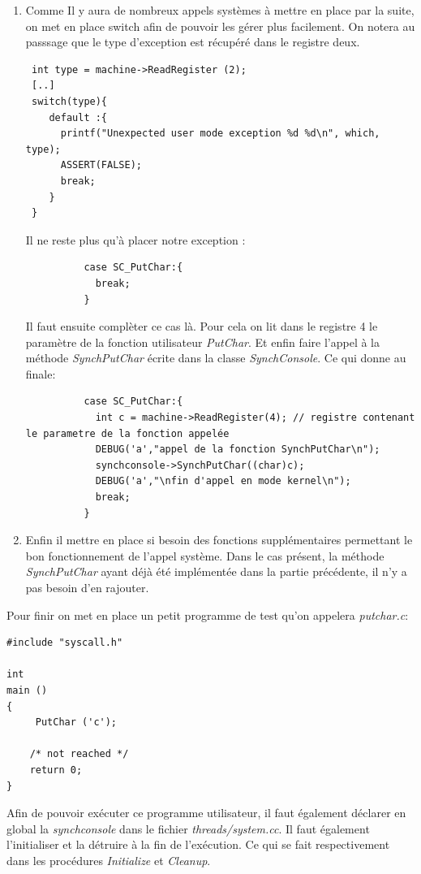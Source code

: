 \documentclass[a4paper,10pt]{article}
\begin{document}
\begin{enumerate}
  \item  Comme Il y aura de nombreux appels systèmes à mettre en place par la suite, on met en place switch afin de pouvoir les gérer plus facilement. 
  On notera au passsage que le type d'exception est récupéré dans le registre deux. 
\begin{lstlisting}
 int type = machine->ReadRegister (2);
 [..]
 switch(type){
    default :{
      printf("Unexpected user mode exception %d %d\n", which, type);
      ASSERT(FALSE);
      break;
    }
 }
\end{lstlisting}
  Il ne reste plus qu'à placer notre exception :
  \begin{lstlisting}
          case SC_PutChar:{
            break;
          }   
  \end{lstlisting}
 Il faut ensuite complèter ce cas là. Pour cela on lit dans le registre 4 le paramètre de la fonction utilisateur \emph{PutChar}. Et enfin faire l'appel
 à la méthode \emph{SynchPutChar} écrite dans la classe \emph{SynchConsole}. Ce qui donne au finale:
 \newpage
 \begin{lstlisting}
          case SC_PutChar:{
            int c = machine->ReadRegister(4); // registre contenant le parametre de la fonction appelée
            DEBUG('a',"appel de la fonction SynchPutChar\n");
            synchconsole->SynchPutChar((char)c);
            DEBUG('a',"\nfin d'appel en mode kernel\n");
            break;
          }  
 \end{lstlisting}
  \item Enfin il mettre en place si besoin des fonctions supplémentaires permettant le bon fonctionnement de l'appel système. Dans le cas présent, la méthode
  \emph{SynchPutChar} ayant déjà été implémentée dans la partie précédente, il n'y a pas besoin d'en rajouter.
  \end{enumerate}

  Pour finir on met en place un petit programme de test qu'on appelera \emph{putchar.c}:
  \begin{lstlisting}
#include "syscall.h"

int
main ()
{
     PutChar ('c');

    /* not reached */
    return 0;
}   
  \end{lstlisting}
  Afin de pouvoir exécuter ce programme utilisateur, il faut également déclarer en global la \emph{synchconsole} dans le fichier \emph{threads/system.cc}. Il 
  faut également l'initialiser et la détruire à la fin de l'exécution. Ce qui se fait respectivement dans les procédures \emph{Initialize} et \emph{Cleanup}.
  
\end{document}
